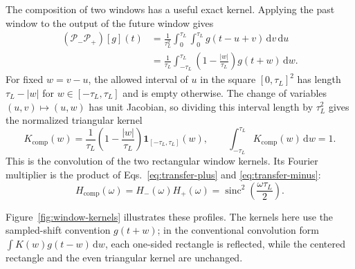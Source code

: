 \documentclass[12pt]{article}
\begin{document}
The composition of two windows has a useful exact kernel. Applying the past window to the output of the future window gives
\begin{align}
  (\mathcal{P}_{-}\mathcal{P}_{+})[g](t)
  &=\frac{1}{\tau_L^2}
    \int_0^{\tau_L}\!\int_0^{\tau_L}
      g(t-u+v)\,\mathrm{d}v\,\mathrm{d}u \\
  &=\frac{1}{\tau_L}\int_{-\tau_L}^{\tau_L}
    \left(1-\frac{|w|}{\tau_L}\right)g(t+w)\,\mathrm{d}w.
  \label{eq:triangular-composition}
\end{align}
For fixed $w=v-u$, the allowed interval of $u$ in the square $[0,\tau_L]^2$ has length $\tau_L-|w|$ for $w\in[-\tau_L,\tau_L]$ and is empty otherwise. The change of variables $(u,v)\mapsto(u,w)$ has unit Jacobian, so dividing this interval length by $\tau_L^2$ gives the normalized triangular kernel
\begin{equation}
  K_{\mathrm{comp}}(w)
  =\frac{1}{\tau_L}\left(1-\frac{|w|}{\tau_L}\right)
    \mathbf{1}_{[-\tau_L,\tau_L]}(w),
  \qquad
  \int_{-\tau_L}^{\tau_L}K_{\mathrm{comp}}(w)\,\mathrm{d}w=1.
  \label{eq:triangular-kernel}
\end{equation}
This is the convolution of the two rectangular window kernels. Its Fourier multiplier is the product of Eqs.~\eqref{eq:transfer-plus} and \eqref{eq:transfer-minus}:
\begin{equation}
  H_{\mathrm{comp}}(\omega)
  =H_{-}(\omega)H_{+}(\omega)
  =\operatorname{sinc}^{2}\!\left(\frac{\omega\tau_L}{2}\right).
  \label{eq:composition-response}
\end{equation}

Figure~\ref{fig:window-kernels} illustrates these profiles. The kernels here use the sampled-shift convention $g(t+w)$; in the conventional convolution form $\int K(w)g(t-w)\,\mathrm{d}w$, each one-sided rectangle is reflected, while the centered rectangle and the even triangular kernel are unchanged.
\end{document}

